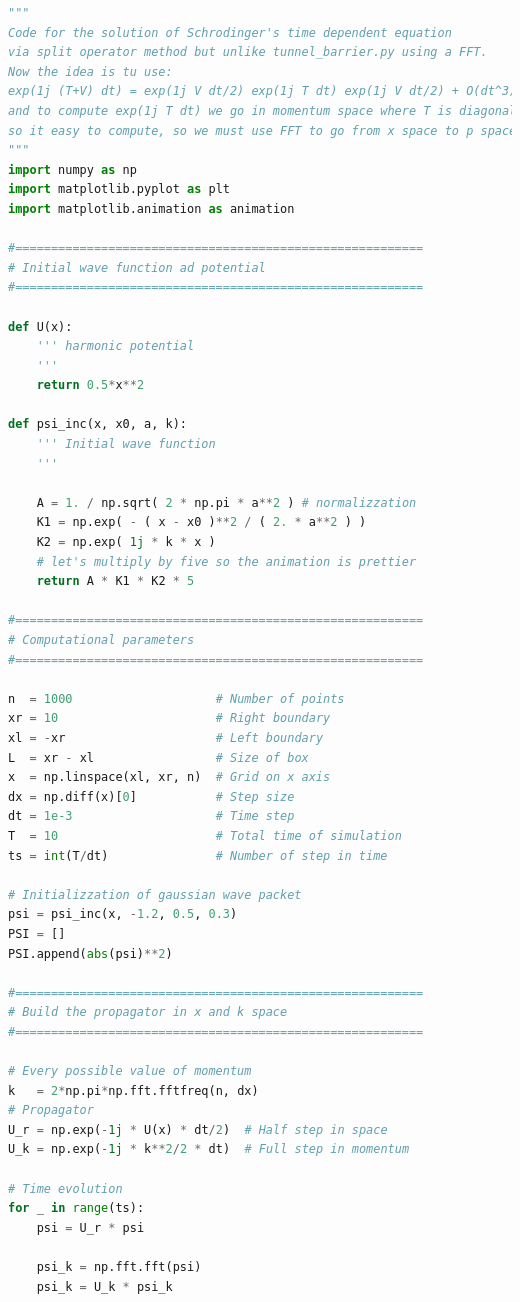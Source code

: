 \documentclass[10pt,a4paper]{article}
\begin{document}
\begin{lstlisting}[language=Python]
"""
Code for the solution of Schrodinger's time dependent equation
via split operator method but unlike tunnel_barrier.py using a FFT.
Now the idea is tu use:
exp(1j (T+V) dt) = exp(1j V dt/2) exp(1j T dt) exp(1j V dt/2) + O(dt^3)
and to compute exp(1j T dt) we go in momentum space where T is diagonal
so it easy to compute, so we must use FFT to go from x space to p space
"""
import numpy as np
import matplotlib.pyplot as plt
import matplotlib.animation as animation

#=========================================================
# Initial wave function ad potential
#=========================================================

def U(x):
    ''' harmonic potential
    '''
    return 0.5*x**2

def psi_inc(x, x0, a, k):
    ''' Initial wave function
    '''

    A = 1. / np.sqrt( 2 * np.pi * a**2 ) # normalizzation
    K1 = np.exp( - ( x - x0 )**2 / ( 2. * a**2 ) )
    K2 = np.exp( 1j * k * x )
    # let's multiply by five so the animation is prettier
    return A * K1 * K2 * 5

#=========================================================
# Computational parameters
#=========================================================

n  = 1000                    # Number of points
xr = 10                      # Right boundary
xl = -xr                     # Left boundary
L  = xr - xl                 # Size of box
x  = np.linspace(xl, xr, n)  # Grid on x axis
dx = np.diff(x)[0]           # Step size
dt = 1e-3                    # Time step
T  = 10                      # Total time of simulation
ts = int(T/dt)               # Number of step in time

# Initializzation of gaussian wave packet
psi = psi_inc(x, -1.2, 0.5, 0.3)
PSI = []
PSI.append(abs(psi)**2)

#=========================================================
# Build the propagator in x and k space
#=========================================================

# Every possible value of momentum
k   = 2*np.pi*np.fft.fftfreq(n, dx)
# Propagator 
U_r = np.exp(-1j * U(x) * dt/2)  # Half step in space
U_k = np.exp(-1j * k**2/2 * dt)  # Full step in momentum

# Time evolution
for _ in range(ts):
    psi = U_r * psi
    
    psi_k = np.fft.fft(psi)
    psi_k = U_k * psi_k
    

\end{lstlisting}
\end{document}
